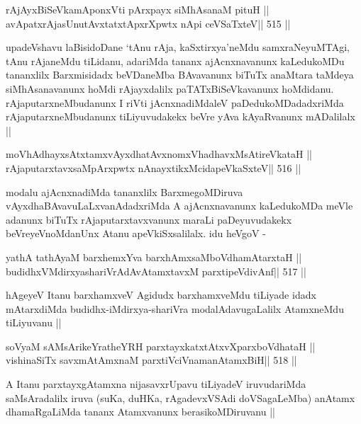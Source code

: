 \begin{shl}
rAjAyxBiSeVkamAponxVti pArxpayx siMhAsanaM pituH ||
avApatxrAjasUnutAvxtatxtApxrXpwtx nApi ceVSaTxteV\hfill || 515 ||
\end{shl}

\begin{artha}
upadeVshavu laBisidoDane `tAnu rAja, kaSxtirxya'neMdu samxraNeyuMTAgi,
tAnu rAjaneMdu tiLidanu, adariMda tananx ajAcnxnavanunx kaLedukoMDu
tananxlilx Barxmisidadx beVDaneMba BAvavanunx biTuTx anaMtara taMdeya
siMhAsanavanunx hoMdi rAjayxdalilx paTATxBiSeVkavanunx
hoMdidanu. rAjaputarxneMbudanunx I riVti jAcnxnadiMdaleV
paDedukoMDadadxriMda rAjaputarxneMbudanunx tiLiyuvudakekx
beVre yAva kAyaRvanunx mADalilalx ||
\end{artha}

\begin{shl}
moVhAdhayxsAtxtamxvAyxdhatAvxnomxVhadhavxMsAtireVkataH ||
rAjaputarxtavxsaMpArxpwtx nAnayxtikxMcidapeVkaSxteV\hfill || 516 ||
\end{shl}

\begin{artha}
modalu ajAcnxnadiMda tananxlilx BarxmegoMDiruva
vAyxdhaBAvavuLaLxvanAdadxriMda A ajAcnxnavanunx kaLedukoMDa meVle
adanunx biTuTx rAjaputarxtavxvanunx maraLi paDeyuvudakekx
beVreyeVnoMdanUnx Atanu apeVkiSxsalilalx. idu heVgoV -
\end{artha}

\begin{shl}
yathA tathA\s yaM barxhemxYva barxhAmxsaMboVdhamAtarxtaH ||
budidhxVMdirxyashariVrAdAvAtamxtavxM parxtipeVdivAnf\hfill || 517 ||
\end{shl}

\begin{artha}
hAgeyeV Itanu barxhamxveV Agidudx barxhamxveMdu tiLiyade
idadx mAtarxdiMda budidhx-iMdirxya-shariVra modalAdavugaLalilx
AtamxneMdu tiLiyuvanu || 
\end{artha}


\begin{shl}
soV\s yaM sAMsArikeYratheYRH parxtayxkatxtAtxvXparxboVdhataH ||
vishinaSiTx savxmAtAmxnaM parxtiVciVnamanAtamxBiH\hfill || 518 ||
\end{shl}

\begin{artha}
A Itanu parxtayxgAtamxna nijasavxrUpavu tiLiyadeV iruvudariMda
saMsAradalilx iruva (suKa, duHKa, rAgadevxVSAdi doVSagaLeMba)
anAtamx dhamaRgaLiMda tananx Atamxvanunx berasikoMDiruvanu ||
\end{artha}

